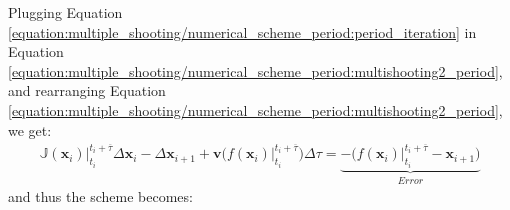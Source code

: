\documentclass[letterpaper,10pt,english,openany,oneside]{sphinxmanual}
\begin{document}
Plugging Equation \eqref{equation:multiple_shooting/numerical_scheme_period:period_iteration} in Equation \eqref{equation:multiple_shooting/numerical_scheme_period:multishooting2_period}, and re\sphinxhyphen{}arranging Equation \eqref{equation:multiple_shooting/numerical_scheme_period:multishooting2_period}, we get:
\begin{equation}\label{equation:multiple_shooting/numerical_scheme_period:multishooting4_period}
\begin{split}      \mathbb{J}(\mathbf{x}_i) \Big \rvert_{t_{i}}^{t_{i}+\overline{\tau}} \Delta\mathbf{x}_i -\Delta\mathbf{x}_{i+1} + \mathbf{v} \big ( f(\mathbf{x}_i)  \big \rvert_{t_{i}}^{t_{i}+\overline{\tau}}\big ) \Delta \tau = \underbrace{-\big(f(\mathbf{x}_i)\big \rvert_{t_{i}}^{t_{i}+\overline{\tau}} - \mathbf{x}_{i+1}\big)}_{Error}\end{split}
\end{equation}
and thus the  scheme becomes:
\end{document}
